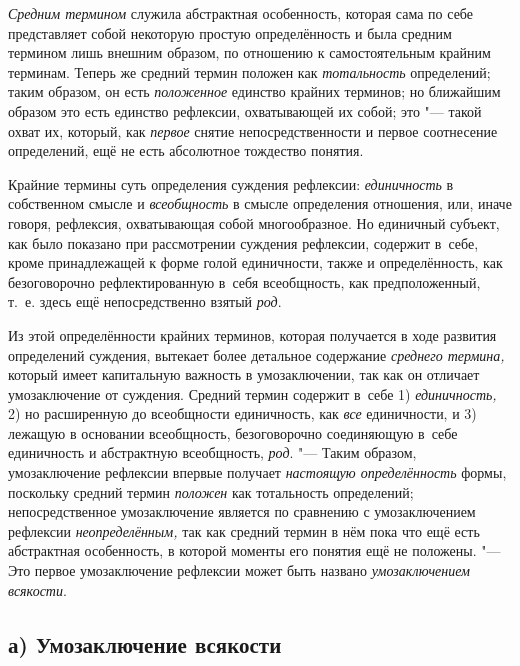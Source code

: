 {\em Средним термином}
служила абстрактная особенность, которая сама по себе
представляет собой некоторую простую определённость и была средним термином
лишь внешним образом, по отношению к самостоятельным крайним терминам.
Теперь же средний термин положен как
{\em тотальность}
определений; таким образом, он есть
{\em положенное} единство
крайних терминов; но ближайшим образом это есть единство рефлексии,
охватывающей их собой; это "--- такой охват их, который, как
{\em первое} снятие
непосредственности и первое соотнесение определений, ещё не есть абсолютное
тождество понятия.

Крайние термины суть определения суждения рефлексии:
{\em единичность} в
собственном смысле и {\em всеобщность}
в смысле определения отношения, или, иначе говоря, рефлексия,
охватывающая собой многообразное. Но единичный субъект, как было показано
при рассмотрении суждения рефлексии, содержит в~себе, кроме принадлежащей к
форме голой единичности, также и определённость, как безоговорочно
рефлектированную в~себя всеобщность, как предположенный, т.~е. здесь ещё
непосредственно взятый {\em род}.

Из этой определённости крайних терминов, которая получается в
ходе развития определений суждения, вытекает более детальное содержание
{\em среднего термина,}
который имеет капитальную важность в умозаключении, так как
он отличает умозаключение от суждения. Средний термин содержит в~себе 1)
{\em единичность,} 2) но
расширенную до всеобщности единичность, как
{\em все} единичности, и
3) лежащую в основании всеобщность, безоговорочно соединяющую в~себе
единичность и абстрактную всеобщность,
{\em род}. "--- Таким
образом, умозаключение рефлексии впервые получает
{\em настоящую определённость}
формы, поскольку средний термин
{\em положен} как
тотальность определений; непосредственное умозаключение является
по сравнению с умозаключением рефлексии
{\em неопределённым,} так
как средний термин в нём пока что ещё есть абстрактная особенность, в
которой моменты его понятия ещё не положены. "--- Это первое
умозаключение рефлексии может быть названо
{\em умозаключением
всякости}.

\subsection[а) Умозаключение всякости]{а) Умозаключение всякости}

